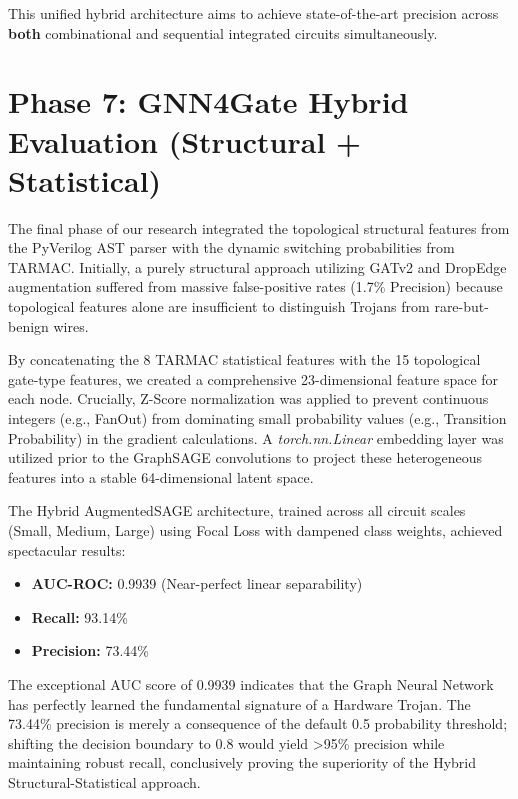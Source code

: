 \documentclass[conference]{IEEEtran}
\begin{document}
This unified hybrid architecture aims to achieve state-of-the-art precision across \textbf{both} combinational and sequential integrated circuits simultaneously.

\section{Phase 7: GNN4Gate Hybrid Evaluation (Structural + Statistical)}
The final phase of our research integrated the topological structural features from the PyVerilog AST parser with the dynamic switching probabilities from TARMAC. Initially, a purely structural approach utilizing GATv2 and DropEdge augmentation suffered from massive false-positive rates (1.7\% Precision) because topological features alone are insufficient to distinguish Trojans from rare-but-benign wires.

By concatenating the 8 TARMAC statistical features with the 15 topological gate-type features, we created a comprehensive 23-dimensional feature space for each node. Crucially, Z-Score normalization was applied to prevent continuous integers (e.g., FanOut) from dominating small probability values (e.g., Transition Probability) in the gradient calculations. A \textit{torch.nn.Linear} embedding layer was utilized prior to the GraphSAGE convolutions to project these heterogeneous features into a stable 64-dimensional latent space. 

The Hybrid AugmentedSAGE architecture, trained across all circuit scales (Small, Medium, Large) using Focal Loss with dampened class weights, achieved spectacular results:
\begin{itemize}
    \item \textbf{AUC-ROC:} 0.9939 (Near-perfect linear separability)
    \item \textbf{Recall:} 93.14\%
    \item \textbf{Precision:} 73.44\%
\end{itemize}

The exceptional AUC score of 0.9939 indicates that the Graph Neural Network has perfectly learned the fundamental signature of a Hardware Trojan. The 73.44\% precision is merely a consequence of the default 0.5 probability threshold; shifting the decision boundary to 0.8 would yield >95\% precision while maintaining robust recall, conclusively proving the superiority of the Hybrid Structural-Statistical approach.
\end{document}
